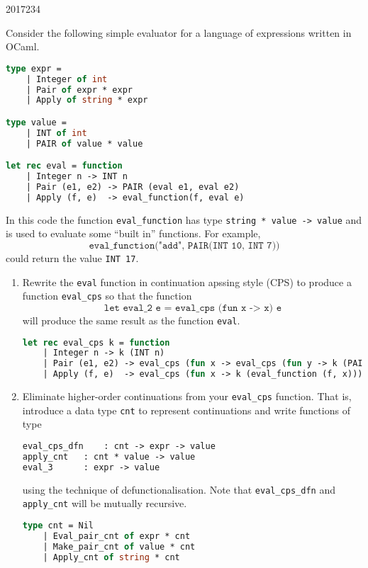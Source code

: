 \documentclass[10pt,\jkfside,a4paper]{article}
\begin{document}
\begin{examquestion}{2017}{23}{4}

Consider the following simple evaluator for a language of expressions
written in OCaml.

\begin{lstlisting}[language=Caml]
type expr =
	| Integer of int
	| Pair of expr * expr
	| Apply of string * expr

type value =
	| INT of int
	| PAIR of value * value

let rec eval = function
	| Integer n	-> INT n
	| Pair (e1, e2)	-> PAIR (eval e1, eval e2)
	| Apply (f, e)	-> eval_function(f, eval e)
\end{lstlisting}
In this code the function \texttt{eval\_function} has type
\texttt{string~*~value~->~value} and is used to evaluate some ``built in''
functions. For example,
\[
\texttt{eval\_function("add", PAIR(INT 10, INT 7))}
\]
could return the value \texttt{INT 17}.

\begin{enumerate}

\item Rewrite the \texttt{eval} function in continuation apssing style (CPS)
to produce a function \texttt{eval\_cps} so that the function
\[
\texttt{let eval\_2 e = eval\_cps (fun x -> x) e}
\]
will produce the same result as the function \texttt{eval}.

\begin{lstlisting}[language=Caml]
let rec eval_cps k = function
	| Integer n	-> k (INT n)
	| Pair (e1, e2)	-> eval_cps (fun x -> eval_cps (fun y -> k (PAIR (x, y)) e2)) e1
	| Apply (f, e)	-> eval_cps (fun x -> k (eval_function (f, x))) e
\end{lstlisting}

\item Eliminate higher-order continuations from your \texttt{eval\_cps}
function. That is, introduce a data type \texttt{cnt} to represent
continuations and write functions of type
\begin{lstlisting}[language=Caml]
eval_cps_dfn	: cnt -> expr -> value
apply_cnt	: cnt * value -> value
eval_3		: expr -> value
\end{lstlisting}
using the technique of defunctionalisation. Note that
\texttt{eval\_cps\_dfn} and \texttt{apply\_cnt} will be mutually recursive.

\begin{lstlisting}[language=Caml]
type cnt = Nil
	| Eval_pair_cnt of expr * cnt
	| Make_pair_cnt of value * cnt
	| Apply_cnt of string * cnt


\end{lstlisting}
\end{enumerate}
\end{examquestion}
\end{document}
